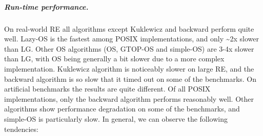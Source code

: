 \documentclass[AMA,STIX1COL]{WileyNJD-v2}
\begin{document}
\subparagraph{Run-time performance.}
%
On real-world RE all algorithms except Kuklewicz and backward perform quite well.
Lazy-OS is the fastest among POSIX implementations, and only \textasciitilde2x slower than LG.
Other OS algorithms (OS, GTOP-OS and simple-OS) are 3-4x slower than LG,
with OS being generally a bit slower due to a more complex implementation.
Kuklewicz algorithm is noticeably slower on large RE,
and the backward algorithm is so slow that it timed out on some of the benchmarks.
%
On artificial benchmarks the results are quite different.
Of all POSIX implementations, only the backward algorithm performs reasonably well.
Other algorithms show performance degradation on some of the benchmarks,
and simple-OS is particularly slow.
%
In general, we can observe the following tendencies:
\end{document}
